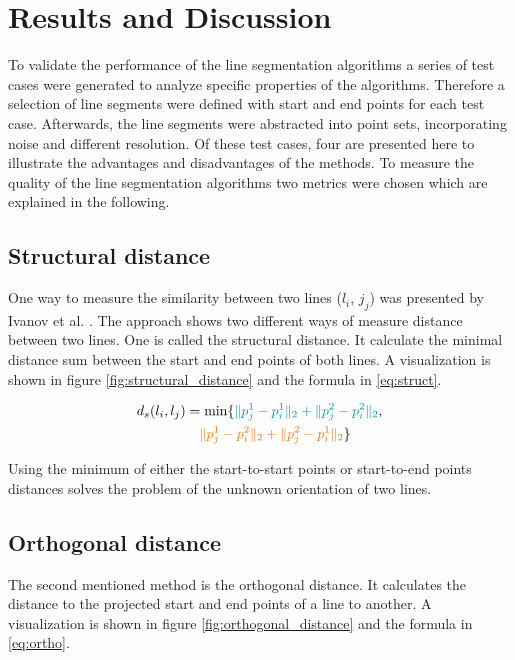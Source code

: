 \documentclass{scp}
\begin{document}
\section{Results and Discussion} 
To validate the performance of the line segmentation algorithms a series of test cases were generated to analyze specific properties of the algorithms. 
Therefore a selection of line segments were defined with start and end points for each test case. Afterwards, the line segments were abstracted into point sets, incorporating noise and different resolution. Of these test cases, four are presented here to illustrate the advantages and disadvantages of the methods. To measure the quality of the line segmentation algorithms two metrics were chosen which are explained in the following.

\subsection*{Structural distance} \label{sec:struct}
One way to measure the similarity between two lines ($l_i$, $j_j$) was presented by Ivanov et al. \cite{Ivanov}. The approach shows two different ways of measure distance between two lines. One is called the structural distance. It calculate the minimal distance sum between the start and end points of both lines. A visualization is shown in figure \ref{fig:structural_distance} and the formula in \eqref{eq:struct}.

\begin{align}
    d_s(l_i, l_j) &= \min\{\color{uzlblue} \|p_j^1 - p_i^1\|_2 + \|p_j^2 - p_i^2\|_2\color{black}, \nonumber \\
    &\quad \color{uzllightorange} \|p_j^1 - p_i^2\|_2 + \|p_j^2 - p_i^1\|_2 \color{black} \} \label{eq:struct}
\end{align}

Using the minimum of either the start-to-start points or start-to-end points distances solves the problem of the unknown orientation of two lines.

 

\subsection*{Orthogonal distance} \label{sec:ortho}
The second mentioned method is the orthogonal distance. It calculates the distance to the projected start and end points of a line to another. A visualization is shown in figure \ref{fig:orthogonal_distance} and the formula in \eqref{eq:ortho}. 
\end{document}
